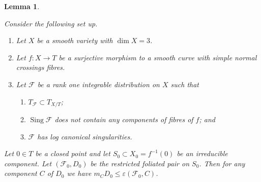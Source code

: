 \documentclass[10pt,a4paper]{amsart}
\newtheorem{lemma}[theorem]{Lemma}
\DeclareMathOperator{\sing}{Sing}
\begin{document}
\begin{lemma}
	\label{lem_sing_adjunction_families}

Consider the following set up.
\begin{enumerate}
    \item Let $X$ be a smooth variety with $\dim X = 3$. 
    \item Let $f\colon X \to T$ be a surjective morphism to a smooth curve with simple normal crossings fibres.
    \item Let $\mathcal F$ be a rank one integrable distribution on $X$ such that
    \begin{enumerate} 
    \item $T_{\mathcal F} \subset T_{X/T}$; 
    \item $\sing \mathcal F$ does not 
contain any components of fibres of $f$; and
\item  $\mathcal F$ has log canonical singularities.
\end{enumerate}
\end{enumerate}

	Let $0 \in T$ be a closed point
	and let $S_0 \subset X_0 = f^{-1}(0)$ be an irreducible component. 
	Let $(\mathcal F_0, D_0)$ be the restricted foliated pair on $S_0$. 
Then for any component $C$ of $D_0$ we have $m_CD_0 \leq \varepsilon(\mathcal F_0, C)$.
\end{lemma}
\end{document}
